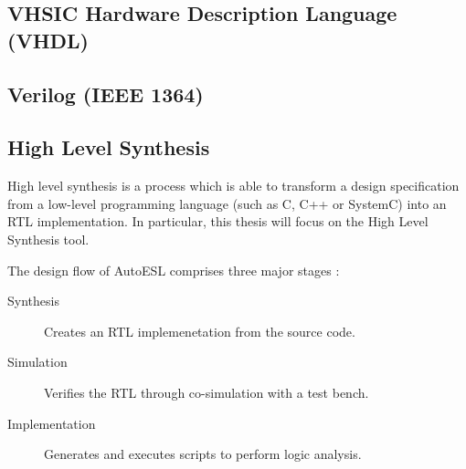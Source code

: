 \subsection{VHSIC Hardware Description Language (VHDL)}

\subsection{Verilog (IEEE 1364)}

\subsection{High Level Synthesis}
High level synthesis is a process which is able to transform a design
specification from a low-level programming language (such as C, C++ or SystemC)
into an \gls{RTL} implementation. In particular, this thesis will focus on the
 High Level Synthesis tool.

The design flow of AutoESL comprises three major stages \cite{XILINX:Tutorial}:
\begin{description}
    \item[Synthesis] Creates an \gls{RTL} implemenetation from the source code.
    \item[Simulation] Verifies the \gls{RTL} through co-simulation with a test
        bench.
    \item[Implementation] Generates and executes scripts to perform logic
        analysis.
\end{description}

